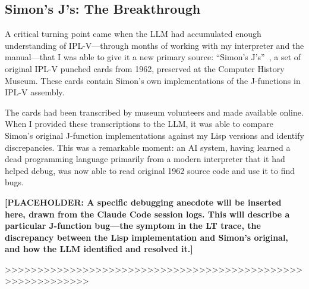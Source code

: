 \documentclass[journal]{IEEEtran}
\begin{document}
\subsection{Simon's J's: The Breakthrough}

A critical turning point came when the LLM had accumulated enough
understanding of IPL-V---through months of working with my interpreter
and the manual---that I was able to give it a new primary source:
``Simon's J's''~\cite{bochannek2012simonsjs}, a set of original IPL-V
punched cards from 1962, preserved at the Computer History Museum.
These cards contain Simon's own implementations of the J-functions in
IPL-V assembly.

The cards had been transcribed by museum volunteers and made available
online. When I provided these transcriptions to the LLM, it was able
to compare Simon's original J-function implementations against my Lisp
versions and identify discrepancies. This was a remarkable moment: an
AI system, having learned a dead programming language primarily from a
modern interpreter that it had helped debug, was now able to read
original 1962 source code and use it to find bugs.

\textbf{[PLACEHOLDER: A specific debugging anecdote will be inserted
here, drawn from the Claude Code session logs. This will describe a
particular J-function bug---the symptom in the LT trace, the
discrepancy between the Lisp implementation and Simon's original, and
how the LLM identified and resolved it.]}

>>>>>>>>>>>>>>>>>>>>>>>>>>>>>>>>>>>>>>>>>>>>>>>>>>>>>>>>>>>
\end{document}
